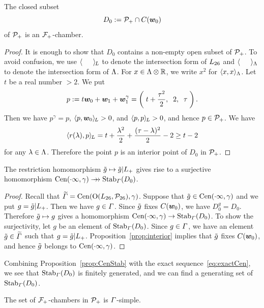 \documentclass{amsart} %
\begin{document}
%
%
\begin{proposition}\label{prop:D0}
The closed subset 
\[
D_0:=\mathord{\mathcal{P}}_{+}\cap \mathord{C}(\boldsymbol{w}_0)
\]
of $\mathord{\mathcal{P}}_{+}$ is an $\mathord{\mathcal{F}}_{+}$-chamber.
\end{proposition}
%
\begin{proof}
It is enough to show that $D_0$ contains a non-empty open subset of $\mathord{\mathcal{P}}_{+}$.
To avoid confusion, we use $\langle \phantom{a, a} \rangle_{\hskip -1pt L}$ to denote the intersection form of $L_{26}$
and $\langle \phantom{a, a} \rangle_{\Lambda}$ to denote the intersection form of $\Lambda$.
For $x\in \Lambda\otimes\mathord{\mathbb{R}}$, we write $x^2$ for $\langle x,x \rangle_{\Lambda}$.
Let $t$ be a real number $>2$.
We put
\[
p:=t\boldsymbol{w}_0+\boldsymbol{w}_1+\boldsymbol{w}_1^{\gamma}=\left(\; t+\frac{\tau^2}{2}, \;\;2, \;\; \tau\;\right).
\]
%
Then we have $p^{\gamma}=p$, $\langle p, \boldsymbol{w}_0 \rangle_{\hskip -1pt L}>0$, and $\langle p, p \rangle_{\hskip -1pt L}>0$,
and hence $p\in \mathord{\mathcal{P}}_{+}$.
We have 
\[
\langle r(\lambda), p \rangle_{\hskip -1pt L}=t+\frac{\lambda^2}{2}+\frac{(\tau-\lambda)^2}{2}-2\ge t-2
\]
for any $\lambda\in \Lambda$.
Therefore the point $p$ is an interior point of $D_0$ in $\mathord{\mathcal{P}}_{+}$.
\end{proof}
%
\begin{proposition}\label{prop:CenStab}
The restriction homomorphism
$\tilde{g}\mapsto \tilde{g}|L_{+}$
gives rise to a surjective homomorphism 
$\mathrm{Cen}(\cdot \infty, \gamma)\mathrel{\rightarrow\!\!\!\!\rightarrow} \operatorname{Stab}_{\varGamma}(D_0)$.
\end{proposition}
%
\begin{proof}
Recall that 
$\widetilde{\varGamma}=\mathrm{Cen}(\mathord{\mathrm{O}}(L_{26}, \mathord{\mathcal{P}}_{26}), \gamma)$.
Suppose that $\tilde{g}\in \mathrm{Cen}(\cdot \infty, \gamma)$
and we put $g=\tilde{g}|L_{+}$.
Then we have $g\in \varGamma$.
Since $\tilde{g}$ fixes $\mathord{C}(\boldsymbol{w}_0)$,
we have $D_0^g=D_0$.
Therefore $\tilde{g}\mapsto g$ gives a homomorphism 
$\mathrm{Cen}(\cdot \infty, \gamma)\to\operatorname{Stab}_{\varGamma}(D_0)$.
To show the surjectivity,
let $g$ be an element of $\operatorname{Stab}_{\varGamma}(D_0)$.
Since $g\in \varGamma$,
we have an element $\tilde{g}\in \widetilde{\varGamma}$ such that $g=\tilde{g}|L_{+}$.
Proposition~\ref{prop:interior} implies that $\tilde{g}$ fixes $\mathord{C}(\boldsymbol{w}_0)$,
and hence $\tilde{g}$ belongs to $\mathrm{Cen}(\cdot \infty, \gamma)$.
\end{proof}
%
%
Combining Proposition~\ref{prop:CenStab} with the exact sequence~\eqref{eq:exactCen}, we see that 
$\operatorname{Stab}_{\varGamma}(D_0)$ is finitely generated,
and we can find a generating set of $\operatorname{Stab}_{\varGamma}(D_0)$.
%
\begin{proposition}\label{prop:PhiSimple}
The set of $\mathord{\mathcal{F}}_{+}$-chambers in $\mathord{\mathcal{P}}_{+}$ is $\varGamma$-simple.
\end{proposition}
%
\end{document}
